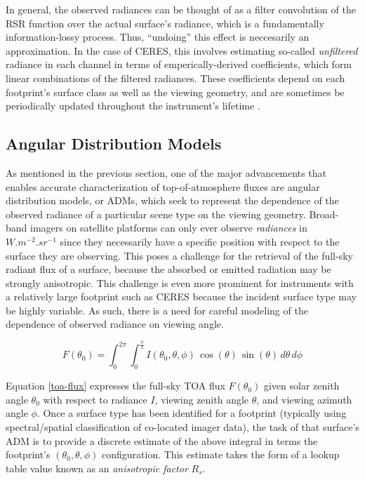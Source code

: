 \documentclass[12pt]{article}
\begin{document}
    In general, the observed radiances can be thought of as a filter convolution of the RSR function over the actual surface's radiance, which is a fundamentally information-lossy process. Thus, ``undoing'' this effect is neccesarily an approximation. In the case of CERES, this involves estimating so-called \textit{unfiltered} radiance in each channel in terms of emperically-derived coefficients, which form linear combinations of the filtered radiances. These coefficients depend on each footprint's surface class as well as the viewing geometry, and are sometimes be periodically updated throughout the instrument's lifetime \cite{loeb_determination_2001}.

    \subsection{Angular Distribution Models}

    As mentioned in the previous section, one of the major advancements that enables accurate characterization of top-of-atmosphere fluxes are angular distribution models, or ADMs, which seek to represent the dependence of the observed radiance of a particular scene type on the viewing geometry. Broad-band imagers on satellite platforms can only ever observe \textit{radiances} in $\si{W.m^{-2}.sr^{-1}}$ since they necessarily have a specific position with respect to the surface they are observing. This poses a challenge for the retrieval of the full-sky radiant flux of a surface, because the absorbed or emitted radiation may be strongly anisotropic. This challenge is even more prominent for instruments with a relatively large footprint such as CERES because the incident surface type may be highly variable. As such, there is a need for careful modeling of the dependence of observed radiance on viewing angle.

    \begin{equation}\label{toa-flux}
        F(\theta_0) = \int_0^{2\pi} \int_0^{\frac{\pi}{2}} I(\theta_0, \theta, \phi) \, \cos(\theta) \, \sin(\theta) \, d \theta \, d \phi
    \end{equation}

    Equation \ref{toa-flux} expresses the full-sky TOA flux $F(\theta_0)$ given solar zenith angle $\theta_0$ with respect to radiance $I$, viewing zenith angle $\theta$, and viewing azimuth angle $\phi$. Once a surface type has been identified for a footprint (typically using spectral/spatial classification of co-located imager data), the task of that surface's ADM is to provide a discrete estimate of the above integral in terms the footprint's $(\theta_0, \theta, \phi)$ configuration. This estimate takes the form of a lookup table value known as an \textit{anisotropic factor} $R_s$.
\end{document}
